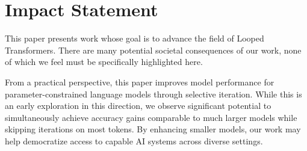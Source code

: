 \section*{Impact Statement}

This paper presents work whose goal is to advance the field
of Looped Transformers. There are many potential societal
consequences of our work, none of which we feel must be
specifically highlighted here.

From a practical perspective, this paper improves model performance for parameter-constrained language models through selective iteration.
While this is an early exploration in this direction, we observe significant potential to simultaneously achieve accuracy gains comparable to much larger models while skipping iterations on most tokens.
By enhancing smaller models, our work may help democratize access to capable AI systems across diverse settings.